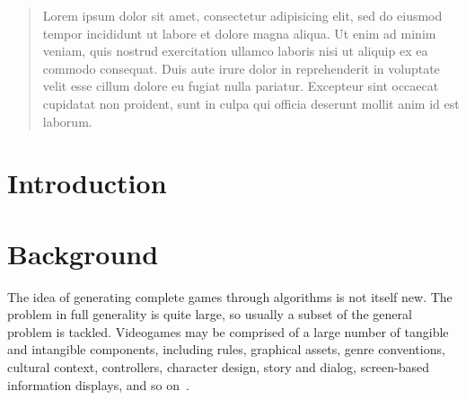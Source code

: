 \documentclass[a4paper,titlepage,final, twoside]{report}
\begin{document}

\setcounter{page}{0}

\begin{spacing}{1.5}
\begin{abstract}
	Lorem ipsum dolor sit amet, consectetur adipisicing elit, sed do eiusmod tempor incididunt ut labore et dolore magna aliqua. Ut enim ad minim veniam, quis nostrud exercitation ullamco laboris nisi ut aliquip ex ea commodo consequat. Duis aute irure dolor in reprehenderit in voluptate velit esse cillum dolore eu fugiat nulla pariatur. Excepteur sint occaecat cupidatat non proident, sunt in culpa qui officia deserunt mollit anim id est laborum.
\end{abstract}
\end{spacing}

\tableofcontents
\newpage


\chapter{Introduction}


\chapter{Background}
The idea of generating complete games through algorithms is not itself new. The problem in full generality is quite large, so usually a subset of the general problem is tackled. Videogames may be comprised of a large number of tangible and intangible components, including rules, graphical assets, genre conventions, cultural context, controllers, character design, story and dialog, screen-based information displays, and so on~\citet{cook2014angelina,liapis2014creativity,nelson2007automated}.
\end{document}
